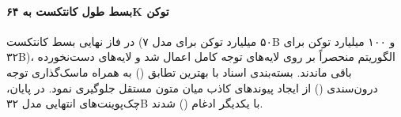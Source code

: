 \paragraph*{بسط طول کانتکست به ۶۴K توکن}
در فاز نهایی بسط کانتکست (۵۰ میلیارد توکن برای مدل ۷B و ۱۰۰ میلیارد توکن برای ۳۲B)، الگوریتم  منحصراً بر روی لایه‌های توجه کامل اعمال شد و لایه‌های  دست‌نخورده باقی ماندند. بسته‌بندی اسناد با بهترین تطابق () به همراه ماسک‌گذاری توجه درون‌سندی () از ایجاد پیوندهای کاذب میان متون مستقل جلوگیری نمود. در پایان، چک‌پوینت‌های انتهایی مدل ۳۲B با یکدیگر ادغام () شدند.